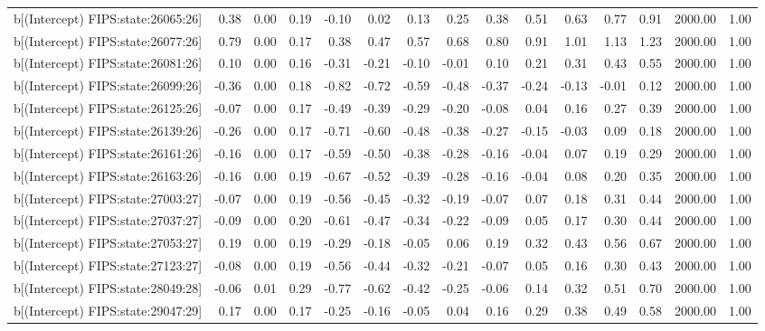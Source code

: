 \begin{table}[ht]
\begin{tabular}{rrrrrrrrrrrrrrr}
  b[(Intercept) FIPS:state:26065:26] & 0.38 & 0.00 & 0.19 & -0.10 & 0.02 & 0.13 & 0.25 & 0.38 & 0.51 & 0.63 & 0.77 & 0.91 & 2000.00 & 1.00 \\ 
  b[(Intercept) FIPS:state:26077:26] & 0.79 & 0.00 & 0.17 & 0.38 & 0.47 & 0.57 & 0.68 & 0.80 & 0.91 & 1.01 & 1.13 & 1.23 & 2000.00 & 1.00 \\ 
  b[(Intercept) FIPS:state:26081:26] & 0.10 & 0.00 & 0.16 & -0.31 & -0.21 & -0.10 & -0.01 & 0.10 & 0.21 & 0.31 & 0.43 & 0.55 & 2000.00 & 1.00 \\ 
  b[(Intercept) FIPS:state:26099:26] & -0.36 & 0.00 & 0.18 & -0.82 & -0.72 & -0.59 & -0.48 & -0.37 & -0.24 & -0.13 & -0.01 & 0.12 & 2000.00 & 1.00 \\ 
  b[(Intercept) FIPS:state:26125:26] & -0.07 & 0.00 & 0.17 & -0.49 & -0.39 & -0.29 & -0.20 & -0.08 & 0.04 & 0.16 & 0.27 & 0.39 & 2000.00 & 1.00 \\ 
  b[(Intercept) FIPS:state:26139:26] & -0.26 & 0.00 & 0.17 & -0.71 & -0.60 & -0.48 & -0.38 & -0.27 & -0.15 & -0.03 & 0.09 & 0.18 & 2000.00 & 1.00 \\ 
  b[(Intercept) FIPS:state:26161:26] & -0.16 & 0.00 & 0.17 & -0.59 & -0.50 & -0.38 & -0.28 & -0.16 & -0.04 & 0.07 & 0.19 & 0.29 & 2000.00 & 1.00 \\ 
  b[(Intercept) FIPS:state:26163:26] & -0.16 & 0.00 & 0.19 & -0.67 & -0.52 & -0.39 & -0.28 & -0.16 & -0.04 & 0.08 & 0.20 & 0.35 & 2000.00 & 1.00 \\ 
  b[(Intercept) FIPS:state:27003:27] & -0.07 & 0.00 & 0.19 & -0.56 & -0.45 & -0.32 & -0.19 & -0.07 & 0.07 & 0.18 & 0.31 & 0.44 & 2000.00 & 1.00 \\ 
  b[(Intercept) FIPS:state:27037:27] & -0.09 & 0.00 & 0.20 & -0.61 & -0.47 & -0.34 & -0.22 & -0.09 & 0.05 & 0.17 & 0.30 & 0.44 & 2000.00 & 1.00 \\ 
  b[(Intercept) FIPS:state:27053:27] & 0.19 & 0.00 & 0.19 & -0.29 & -0.18 & -0.05 & 0.06 & 0.19 & 0.32 & 0.43 & 0.56 & 0.67 & 2000.00 & 1.00 \\ 
  b[(Intercept) FIPS:state:27123:27] & -0.08 & 0.00 & 0.19 & -0.56 & -0.44 & -0.32 & -0.21 & -0.07 & 0.05 & 0.16 & 0.30 & 0.43 & 2000.00 & 1.00 \\ 
  b[(Intercept) FIPS:state:28049:28] & -0.06 & 0.01 & 0.29 & -0.77 & -0.62 & -0.42 & -0.25 & -0.06 & 0.14 & 0.32 & 0.51 & 0.70 & 2000.00 & 1.00 \\ 
  b[(Intercept) FIPS:state:29047:29] & 0.17 & 0.00 & 0.17 & -0.25 & -0.16 & -0.05 & 0.04 & 0.16 & 0.29 & 0.38 & 0.49 & 0.58 & 2000.00 & 1.00 \\ 

\end{tabular}
\end{table}
